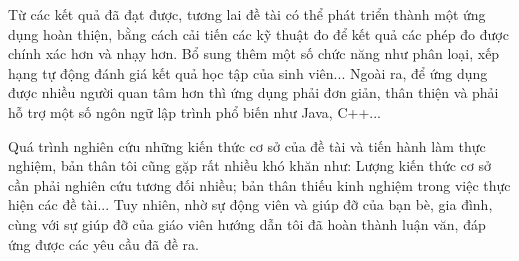 Từ các kết quả đã đạt được, tương lai đề tài có thể phát triển thành 
một ứng dụng hoàn thiện, bằng cách cải tiến các kỹ thuật đo để kết quả 
các phép đo được chính xác hơn và nhạy hơn. Bổ sung thêm một số chức năng 
như phân loại, xếp hạng tự động đánh giá kết quả học tập của sinh viên... 
Ngoài ra, để ứng dụng được nhiều người quan tâm hơn thì ứng dụng phải 
đơn giản, thân thiện và phải hỗ trợ một số ngôn ngữ lập trình phổ biến như Java, C++... 

Quá trình nghiên cứu những kiến thức cơ sở của đề tài và tiến hành làm 
thực nghiệm, bản thân tôi cũng gặp rất nhiều khó khăn như: Lượng kiến thức 
cơ sở cần phải nghiên cứu tương đối nhiều; bản thân thiếu kinh nghiệm trong 
việc thực hiện các đề tài... Tuy nhiên, nhờ sự động viên và giúp đỡ của bạn 
bè, gia đình, cùng với sự giúp đỡ của giáo viên hướng dẫn tôi đã hoàn 
thành luận văn, đáp ứng được các yêu cầu đã đề ra.


